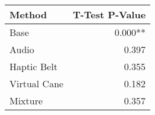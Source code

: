 
\centering
\begin{tabular}{lr}
\toprule
      Method & T-Test P-Value \\
\midrule
        Base &        0.000** \\
       Audio &          0.397 \\
 Haptic Belt &          0.355 \\
Virtual Cane &          0.182 \\
     Mixture &          0.357 \\
\bottomrule
\end{tabular}
